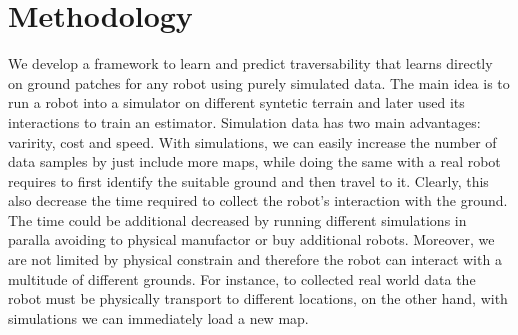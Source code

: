 \documentclass[../document.tex]{subfiles}
\begin{document}
\chapter{Methodology}
We develop a framework to learn and predict traversability that learns directly on ground patches for any robot using purely simulated data. The main idea is to run a robot into a simulator on different syntetic terrain and later used its interactions to train an estimator. Simulation data has two main advantages: varirity, cost and speed. With simulations, we can easily increase the number of data samples by just include more maps, while doing the same with a real robot requires to first identify the suitable ground and then travel to it. Clearly, this also decrease the time required to collect the robot's interaction with the ground. The time could be additional decreased by running different simulations in paralla avoiding to physical manufactor or buy additional robots. 
Moreover, we are not limited by physical constrain and therefore the robot can interact with a multitude of different grounds. For instance, to collected real world data the robot must be physically transport to different locations, on the other hand, with simulations we can immediately load a new map.
\end{document}

